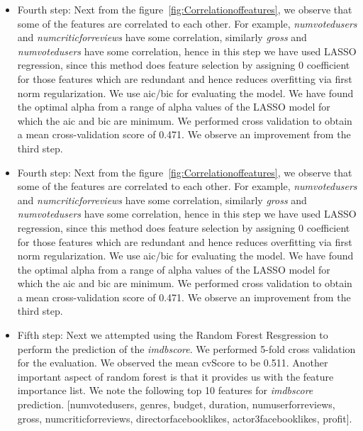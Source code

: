 \documentclass{article}%
\begin{document}
\begin{itemize}
\item Fourth step: Next from the figure~\ref{fig:Correlationoffeatures}, we observe that some of the features are correlated to each other. For example, \textit{numvotedusers} and \textit{numcriticforreviews} have some correlation, similarly \textit{gross} and \textit{numvotedusers} have some correlation, hence in this step we have used LASSO regression, since this method does feature selection by assigning 0 coefficient for those features which are redundant and hence reduces overfitting via first norm regularization. We use aic/bic for evaluating the model. We have found the optimal alpha from a range of alpha values of the LASSO model for which the aic and bic are minimum. We performed cross validation to obtain a mean cross-validation score of 0.471. We observe an improvement from the third step.
\end{itemize}

\begin{itemize}
\item Fourth step: Next from the figure~\ref{fig:Correlationoffeatures}, we observe that some of the features are correlated to each other. For example, \textit{numvotedusers} and \textit{numcriticforreviews} have some correlation, similarly \textit{gross} and \textit{numvotedusers} have some correlation, hence in this step we have used LASSO regression, since this method does feature selection by assigning 0 coefficient for those features which are redundant and hence reduces overfitting via first norm regularization. We use aic/bic for evaluating the model. We have found the optimal alpha from a range of alpha values of the LASSO model for which the aic and bic are minimum. We performed cross validation to obtain a mean cross-validation score of 0.471. We observe an improvement from the third step.
\end{itemize}

\begin{itemize}
\item Fifth step: Next we attempted using the Random Forest Resgression to perform the prediction of the \textit{imdbscore}. We performed 5-fold cross validation for the evaluation. We observed the mean cvScore to be 0.511. Another important aspect of random forest is that it provides us with the feature importance list. We note the following top 10 features for \textit{imdbscore} prediction. [numvotedusers, genres, budget, duration, numuserforreviews, gross, numcriticforreviews, directorfacebooklikes, actor3facebooklikes, profit]. 
\end{itemize}
\end{document}
